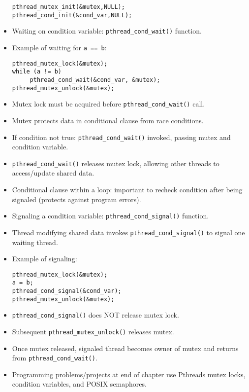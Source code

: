 \begin{itemize}
\begin{verbatim}
pthread_mutex_init(&mutex,NULL);
pthread_cond_init(&cond_var,NULL);
    \end{verbatim}
    \item Waiting on condition variable: \texttt{pthread\_cond\_wait()} function.
    \item Example of waiting for \texttt{a == b}:
    \begin{verbatim}
pthread_mutex_lock(&mutex);
while (a != b)
     pthread_cond_wait(&cond_var, &mutex);
pthread_mutex_unlock(&mutex);
    \end{verbatim}
    \item Mutex lock must be acquired before \texttt{pthread\_cond\_wait()} call.
    \item Mutex protects data in conditional clause from race conditions.
    \item If condition not true: \texttt{pthread\_cond\_wait()} invoked, passing mutex and condition variable.
    \item \texttt{pthread\_cond\_wait()} releases mutex lock, allowing other threads to access/update shared data.
    \item Conditional clause within a loop: important to recheck condition after being signaled (protects against program errors).
    \item Signaling a condition variable: \texttt{pthread\_cond\_signal()} function.
    \item Thread modifying shared data invokes \texttt{pthread\_cond\_signal()} to signal one waiting thread.
    \item Example of signaling:
    \begin{verbatim}
pthread_mutex_lock(&mutex);
a = b;
pthread_cond_signal(&cond_var);
pthread_mutex_unlock(&mutex);
    \end{verbatim}
    \item \texttt{pthread\_cond\_signal()} does NOT release mutex lock.
    \item Subsequent \texttt{pthread\_mutex\_unlock()} releases mutex.
    \item Once mutex released, signaled thread becomes owner of mutex and returns from \texttt{pthread\_cond\_wait()}.
    \item Programming problems/projects at end of chapter use Pthreads mutex locks, condition variables, and POSIX semaphores.
\end{itemize}

